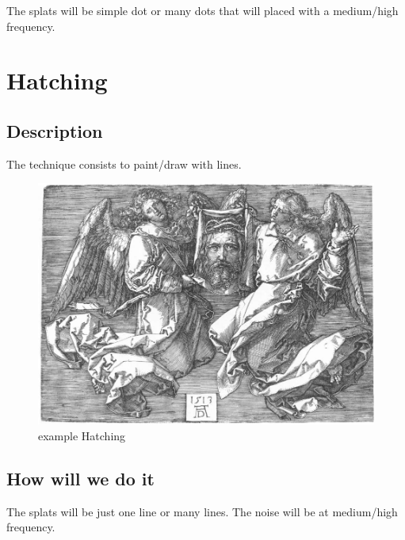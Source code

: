 \documentclass[12pt]{article}
\begin{document}
The splats will be simple dot or many dots that will placed with a medium/high frequency.

\section{Hatching}

\subsection*{Description}

The technique consists to paint/draw with lines.

\begin{figure}[!ht]
    \begin{center}
        \includegraphics[scale=0.6]{image/hatching.jpg}
        \caption{example Hatching}
    \end{center}
\end{figure}

\subsection*{How will we do it}

The splats will be just one line or many lines. The noise will be at medium/high frequency.
\end{document}
